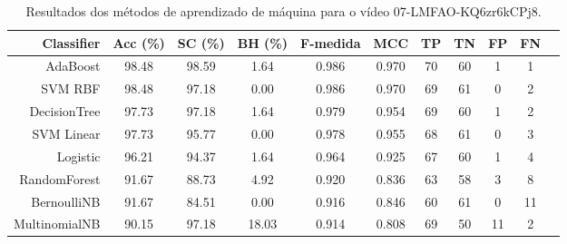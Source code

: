 \begin{table}[!htb]
\centering
\caption{Resultados dos métodos de aprendizado de máquina para o vídeo 07-LMFAO-KQ6zr6kCPj8.}
\label{tab:07-LMFAO-KQ6zr6kCPj8}
\begin{tabular}{r|c|c|c|c|c|c|c|c|c|c}
\hline\hline
Classifier & Acc (\%) & SC (\%) & BH (\%) & F-medida & MCC & TP & TN & FP & FN \\ \hline
AdaBoost & 98.48 & 98.59 & 1.64 & 0.986 & 0.970 & 70 & 60 & 1 & 1 \\ 
SVM RBF & 98.48 & 97.18 & 0.00 & 0.986 & 0.970 & 69 & 61 & 0 & 2 \\ 
DecisionTree & 97.73 & 97.18 & 1.64 & 0.979 & 0.954 & 69 & 60 & 1 & 2 \\ 
SVM Linear & 97.73 & 95.77 & 0.00 & 0.978 & 0.955 & 68 & 61 & 0 & 3 \\ 
Logistic & 96.21 & 94.37 & 1.64 & 0.964 & 0.925 & 67 & 60 & 1 & 4 \\ 
RandomForest & 91.67 & 88.73 & 4.92 & 0.920 & 0.836 & 63 & 58 & 3 & 8 \\ 
BernoulliNB & 91.67 & 84.51 & 0.00 & 0.916 & 0.846 & 60 & 61 & 0 & 11 \\ 
MultinomialNB & 90.15 & 97.18 & 18.03 & 0.914 & 0.808 & 69 & 50 & 11 & 2 \\ 
\hline\hline
\end{tabular}
\end{table}
